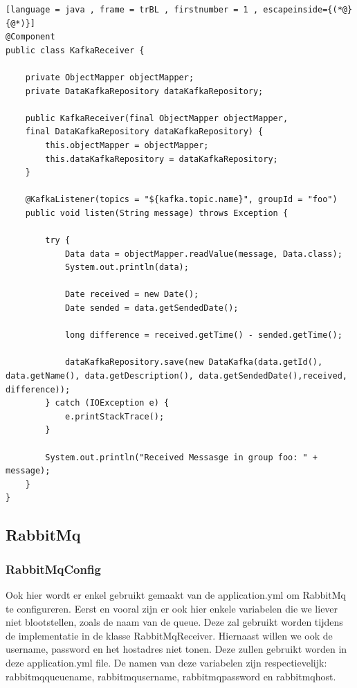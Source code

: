\begin{lstlisting}[language = java , frame = trBL , firstnumber = 1 , escapeinside={(*@}{@*)}]
@Component
public class KafkaReceiver {
    
    private ObjectMapper objectMapper;
    private DataKafkaRepository dataKafkaRepository;
    
    public KafkaReceiver(final ObjectMapper objectMapper,
    final DataKafkaRepository dataKafkaRepository) {
        this.objectMapper = objectMapper;
        this.dataKafkaRepository = dataKafkaRepository;
    }
    
    @KafkaListener(topics = "${kafka.topic.name}", groupId = "foo")
    public void listen(String message) throws Exception {
        
        try {
            Data data = objectMapper.readValue(message, Data.class);
            System.out.println(data);
            
            Date received = new Date();
            Date sended = data.getSendedDate();
            
            long difference = received.getTime() - sended.getTime();
            
            dataKafkaRepository.save(new DataKafka(data.getId(), data.getName(), data.getDescription(), data.getSendedDate(),received, difference));
        } catch (IOException e) {
            e.printStackTrace();
        }
        
        System.out.println("Received Messasge in group foo: " + message);
    }
}
\end{lstlisting}
\subsection{RabbitMq}
\subsubsection{RabbitMqConfig}
Ook hier wordt er enkel gebruikt gemaakt van de application.yml om RabbitMq te configureren. Eerst en vooral zijn er ook hier enkele variabelen die we liever niet blootstellen, zoals de naam van de queue. Deze zal gebruikt worden tijdens de implementatie in de klasse RabbitMqReceiver. Hiernaast willen we ook de username,  password en het hostadres niet tonen. Deze zullen gebruikt worden in deze application.yml file. De namen van deze variabelen zijn respectievelijk: rabbitmq\textunderscore queue\textunderscore name, rabbitmq\textunderscore username, rabbitmq\textunderscore password en rabbitmq\textunderscore host. 

